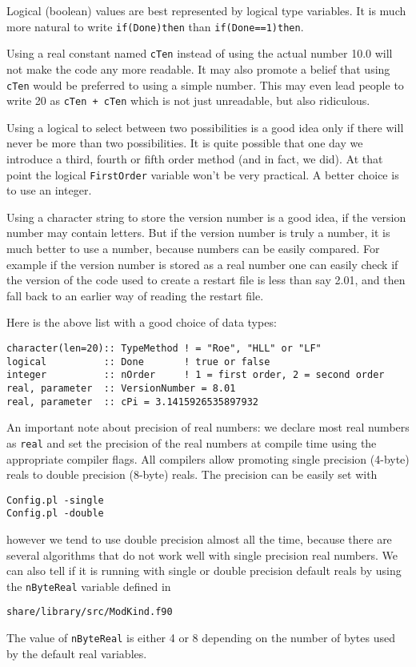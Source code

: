 \documentclass{article}
\begin{document}
Logical (boolean) values are best represented by logical type variables.
It is much more natural to write {\tt if(Done)then} than 
{\tt if(Done==1)then}. 

Using a real constant named {\tt cTen} instead
of using the actual number 10.0 will not make the code any more readable.
It may also promote a belief that using {\tt cTen} would be preferred to
using a simple number. This may even lead people to write 20 as 
{\tt cTen + cTen} which is not just unreadable, but also ridiculous.

Using a logical to select between two possibilities
is a good idea only if there will never be more than two possibilities.
It is quite possible that one day we introduce a third, fourth or fifth order
method (and in fact, we did).
At that point the logical {\tt FirstOrder} variable won't be 
very practical. A better choice is to use an integer. 

Using a character string to store the version number is a good idea,
if the version number may contain letters. But if the version number 
is truly a number, it is much better to use a number, because numbers can
be easily compared. For example if the version number is stored
as a real number one can easily check if the version of the code
used to create a restart file is less than say 2.01, and then fall back
to an earlier way of reading the restart file.

Here is the above list with a good choice of data types:
\begin{verbatim}
character(len=20):: TypeMethod ! = "Roe", "HLL" or "LF"
logical          :: Done       ! true or false
integer          :: nOrder     ! 1 = first order, 2 = second order
real, parameter  :: VersionNumber = 8.01
real, parameter  :: cPi = 3.1415926535897932
\end{verbatim}
An important note about precision of real numbers: we declare
most real numbers as {\tt real} and set the precision of the
real numbers at compile time using the appropriate compiler flags.
All compilers allow promoting single precision (4-byte) reals to 
double precision (8-byte) reals. The precision can be easily set with
\begin{verbatim}
Config.pl -single
Config.pl -double
\end{verbatim}
however we tend to use double precision almost all the time, because
there are several algorithms that do not work well with single precision
real numbers. We can also tell if it is running with single or
double precision default reals by using the {\tt nByteReal} variable
defined in
\begin{verbatim}
share/library/src/ModKind.f90
\end{verbatim}
The value of {\tt nByteReal} is either 4 or 8 depending on 
the number of bytes used by the default real variables.
\end{document}

